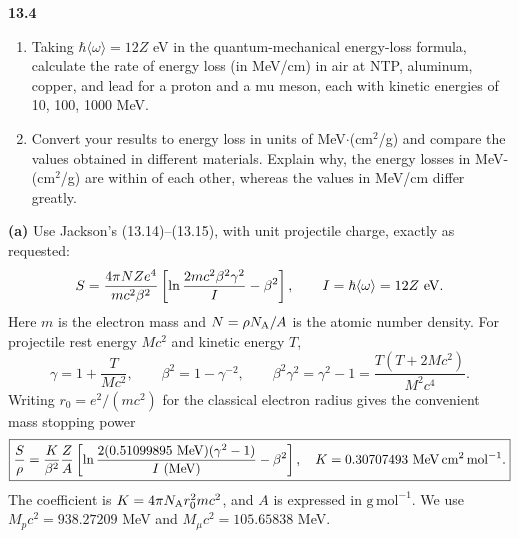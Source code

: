 \par\bigskip
\noindent\textbf{13.4}\quad\begin{enumerate}
\item[(a)] Taking $\hbar\langle\omega\rangle=12Z$ eV in the quantum-mechanical energy-loss formula, calculate the rate of energy loss (in MeV/cm) in air at NTP, aluminum, copper, and lead for a proton and a mu meson, each with kinetic energies of 10, 100, 1000 MeV.
\item[(b)] Convert your results to energy loss in units of MeV$\cdot$(cm$^{2}$/g) and compare the values obtained in different materials. Explain why,  the energy losses in MeV-(cm$^{2}$/g) are within  of each other, whereas the values in MeV/cm differ greatly.
\end{enumerate}
\solution
\textbf{(a)} Use Jackson's (13.14)--(13.15), with unit projectile
charge, exactly as requested:
\[
 S=\frac{4\pi NZ e^4}{mc^2\beta^2}
 \left[\ln\frac{2mc^2\beta^2\gamma^2}{I}-\beta^2\right],
 \qquad I=\hbar\langle\omega\rangle=12Z\ {\rm eV}.
\]
Here $m$ is the electron mass and $N=\rho N_{\rm A}/A$ is the atomic
number density. For projectile rest energy $Mc^2$ and kinetic energy $T$,
\[
 \gamma=1+\frac{T}{Mc^2},\qquad
 \beta^2=1-\gamma^{-2},\qquad
 \beta^2\gamma^2=\gamma^2-1
 =\frac{T(T+2Mc^2)}{M^2c^4}.
\]
Writing $r_0=e^2/(mc^2)$ for the classical electron radius gives
the convenient mass stopping power
\[
 \boxed{\frac S\rho=
 \frac{K}{\beta^2}\frac ZA
 \left[\ln\frac{2(0.51099895\ {\rm MeV})(\gamma^2-1)}
 {I\ ({\rm MeV})}-\beta^2\right],\quad
 K=0.30707493\ {\rm MeV\,cm^2\,mol^{-1}}.}
\]
The coefficient is $K=4\pi N_{\rm A}r_0^2mc^2$, and $A$ is expressed
in $\mathrm{g\,mol^{-1}}$. We use
$M_pc^2=938.27209$ MeV and $M_\mu c^2=105.65838$ MeV.

